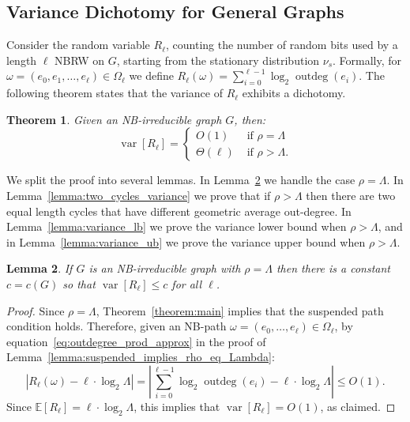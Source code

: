 \documentclass{article}
\newtheorem{theorem}{Theorem}
\newtheorem{lemma}[theorem]{Lemma}
\newcommand{\E}{\mathbb{E}} %
\DeclareMathOperator{\var}{var}
\DeclareMathOperator{\outdeg}{outdeg}
\begin{document}
\subsection{Variance Dichotomy for General Graphs}\label{subsect:dichotomy}

Consider the random variable $R_\ell$, 
counting the number of random bits used by a length $\ell$ NBRW on $G$, starting from the stationary distribution $\nu_s$. 
Formally, for $\omega = (e_0,e_1,\ldots,e_\ell) \in \Omega_\ell$ we define $R_\ell(\omega) = \sum_{i=0}^{\ell-1} \log_2 \outdeg(e_i)$.
The following theorem states that the variance of $R_\ell$ exhibits a dichotomy.

\begin{theorem}\label{theorem:variance_dichotomy}
    Given an NB-irreducible graph $G$, then:
    \begin{equation*}
        \var[R_\ell] = \begin{cases}
            O(1)     & \mbox{ if }\rho = \Lambda \\
            \Theta(\ell) & \mbox{ if }\rho > \Lambda.
        \end{cases}
    \end{equation*}
\end{theorem}

We split the proof into several lemmas. In Lemma~\ref{lemma:variance_if_rho_eq_Lambda} we handle the case $\rho = \Lambda$. 
In Lemma~\ref{lemma:two_cycles_variance} we prove that  if $\rho > \Lambda$ then there are two equal length cycles that have different geometric average out-degree.
In Lemma~\ref{lemma:variance_lb} we prove the variance lower bound when $\rho > \Lambda$,
and in Lemma~\ref{lemma:variance_ub} we prove the variance upper bound when $\rho > \Lambda$.

\begin{lemma}\label{lemma:variance_if_rho_eq_Lambda}
    If $G$ is an NB-irreducible graph with $\rho = \Lambda$ then there is a constant $c=c(G)$ so that $\var[R_\ell] \leq c$ for all $\ell$.
\end{lemma}

\begin{proof}
    Since $\rho=\Lambda$, Theorem~\ref{theorem:main} implies that the suspended path condition holds.
    Therefore, given an NB-path $\omega = (e_0,\ldots,e_\ell)\in \Omega_\ell$, by equation~\eqref{eq:outdegree_prod_approx} in the proof of Lemma~\ref{lemma:suspended_implies_rho_eq_Lambda}: 
    \begin{equation}
          \left\vert R_\ell(\omega) - \ell \cdot \log_2 \Lambda \right\vert
        = \left\vert \sum_{i=0}^{\ell-1} \log_2 \outdeg(e_i)  - \ell \cdot \log_2 \Lambda \right\vert
        \leq O(1). 
    \end{equation}
    Since $\E[R_\ell] = \ell \cdot \log_2 \Lambda$, this implies that $\var[R_\ell] = O(1)$, as claimed.    
\end{proof}
\end{document}
